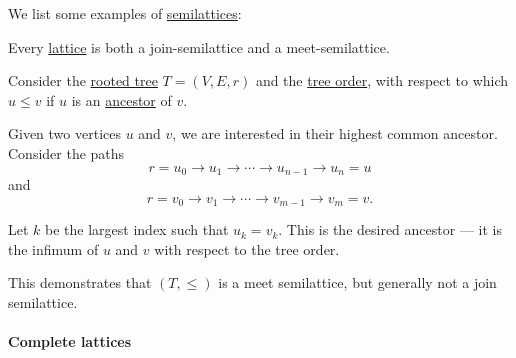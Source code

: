 \begin{example}\label{ex:def:semilattice}
  We list some examples of \hyperref[def:semilattice]{semilattices}:
  \begin{thmenum}
     Every \hyperref[def:lattice]{lattice} is both a join-semilattice and a meet-semilattice.

     Consider the \hyperref[def:rooted_tree]{rooted tree} \( T = (V, E, r) \) and the \hyperref[def:rooted_tree/order]{tree order}, with respect to which \( u \leq v \) if \( u \) is an \hyperref[def:rooted_tree/ancestor_descendant]{ancestor} of \( v \).

    Given two vertices \( u \) and \( v \), we are interested in their highest common ancestor. Consider the paths
    \begin{equation*}
      r = u_0 \to u_1 \to \cdots \to u_{n-1} \to u_n = u
    \end{equation*}
    and
    \begin{equation*}
      r = v_0 \to v_1 \to \cdots \to v_{m-1} \to v_m = v.
    \end{equation*}

    Let \( k \) be the largest index such that \( u_k = v_k \). This is the desired ancestor --- it is the infimum of \( u \) and \( v \) with respect to the tree order.

    This demonstrates that \( (T, \leq) \) is a meet semilattice, but generally not a join semilattice.
  \end{thmenum}
\end{example}

\paragraph{Complete lattices}

